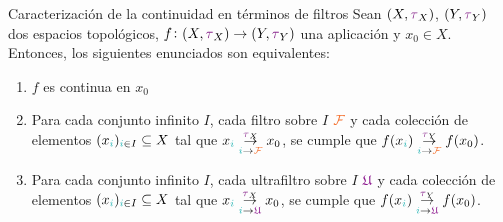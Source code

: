 \documentclass[titlepage,11pt,a4paper]{book}
\newcommand{\filt}{\ensuremath{\textcolor{Orange}{\mathcal{F}}}}
\newcommand{\ultf}{\ensuremath{\textcolor{Plum}{\mathfrak{U}}}}
\newcommand{\ii}{\ensuremath{\textcolor{TealBlue}{i}}}
\newcommand{\taut}{\textcolor{Fuchsia}{\tau}}
\begin{document}
    \begin{prop*}{Caracterización de la continuidad en términos de filtros}
     Sean $(X,\taut_{X})$, $(Y,\taut_{Y})$ dos espacios topológicos, $f \colon (X, \taut_{X}) \to (Y, \taut_{Y})$ una aplicación y $x_0 \in X$. Entonces, los siguientes enunciados son equivalentes:
     \begin{enumerate}
        \item[(1)] $f$ es continua en $x_0$
        \item[(2)] Para cada conjunto infinito $I$, cada filtro sobre $I$ $\filt$ y cada colección de elementos $(x_{\ii})_{\ii \in I} \subseteq X$ tal que $x_{\ii} \underset{\ii \to \filt}{\overset{\taut_{X}}{\to}} x_{0}$, se cumple que $f(x_{\ii}) \underset{\ii \to \filt}{\overset{\taut_{Y}}{\to}} f(x_{0})$.
        \item[(3)] Para cada conjunto infinito $I$, cada ultrafiltro sobre $I$ $\ultf$ y cada colección de elementos $(x_{\ii})_{\ii \in I} \subseteq X$ tal que $x_{\ii} \underset{\ii \to \ultf}{\overset{\taut_{X}}{\to}} x_{0}$, se cumple que $f(x_{\ii}) \underset{\ii \to \ultf}{\overset{\taut_{Y}}{\to}} f(x_{0})$.   
     \end{enumerate}
    \end{prop*}
\end{document}
